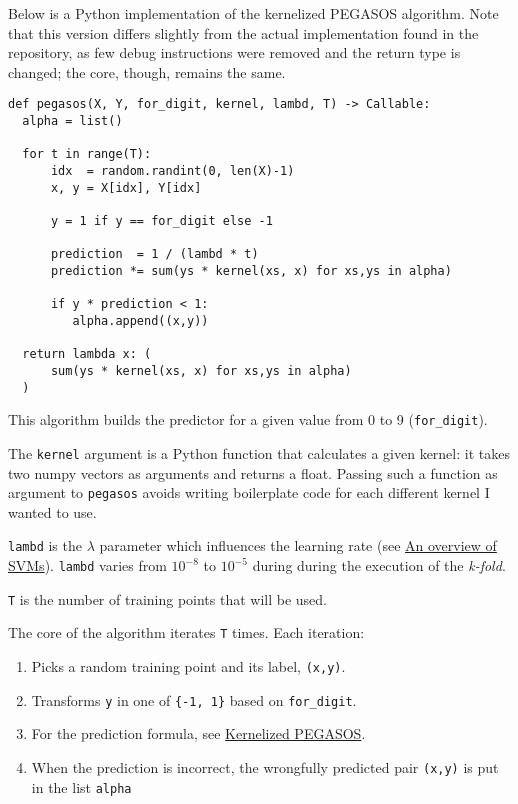 \documentclass[a4paper]{article}
\begin{document}
Below is a Python implementation of the kernelized PEGASOS algorithm. Note that this version differs slightly from the actual implementation found in the repository, as few debug instructions were removed and the return type is changed; the core, though, remains the same.

\lstset{language=Python,label= ,caption= ,captionpos=b,numbers=none}
\begin{lstlisting}
def pegasos(X, Y, for_digit, kernel, lambd, T) -> Callable:
  alpha = list()

  for t in range(T):
      idx  = random.randint(0, len(X)-1)
      x, y = X[idx], Y[idx]

      y = 1 if y == for_digit else -1

      prediction  = 1 / (lambd * t)
      prediction *= sum(ys * kernel(xs, x) for xs,ys in alpha)

      if y * prediction < 1:
	     alpha.append((x,y))

  return lambda x: (
      sum(ys * kernel(xs, x) for xs,ys in alpha)
  )
\end{lstlisting}

This algorithm builds the predictor for a given value from 0 to 9 (\texttt{for\_digit}).

The \texttt{kernel} argument is a Python function that calculates a given kernel: it takes two numpy vectors as arguments and returns a float. Passing such a function as argument to \texttt{pegasos} avoids writing boilerplate code for each different kernel I wanted to use.

\texttt{lambd} is the \(\lambda\) parameter which influences the learning rate (see \hyperref[org857a182]{An overview of SVMs}). \texttt{lambd} varies from \(10^{-8}\) to \(10^{-5}\) during during the execution of the \emph{k-fold}.

\texttt{T} is the number of training points that will be used.

The core of the algorithm iterates \texttt{T} times. Each iteration:

\begin{enumerate}
\item Picks a random training point and its label, \texttt{(x,y)}.
\item Transforms \texttt{y} in one of \texttt{\{-1, 1\}} based on \texttt{for\_digit}.
\item For the prediction formula, see \hyperref[org1f67d8e]{Kernelized PEGASOS}.
\item When the prediction is incorrect, the wrongfully predicted pair \texttt{(x,y)} is put in the list \texttt{alpha}
\end{enumerate}
\end{document}

